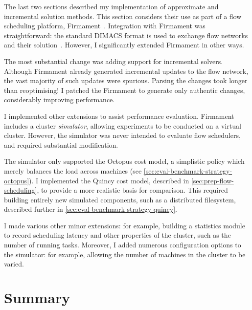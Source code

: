 The last two sections described my implementation of approximate and incremental solution methods. This section considers their use as part of a flow scheduling platform, Firmament~\cite[ch.~5]{Schwarzkopf:2015}. Integration with Firmament was straightforward: the standard DIMACS format is used to exchange flow networks and their solution~\cite{DIMACSStandard}. However, I significantly extended Firmament in other ways.

The most substantial change was adding support for incremental solvers. Although Firmament already generated incremental updates to the flow network, the vast majority of such updates were spurious\footnotemark. Parsing the changes took longer than reoptimising! I patched the Firmament to generate only authentic changes, considerably improving performance.

I implemented other extensions to assist performance evaluation. Firmament includes a cluster \emph{simulator}, allowing experiments to be conducted on a virtual cluster. However, the simulator was never intended to evaluate flow schedulers, and required substantial modification.

The simulator only supported the Octopus cost model, a simplistic policy which merely balances the load across machines (see \cref{sec:eval-benchmark-strategy-octopus}). I implemented the Quincy cost model, described in \cref{sec:prep-flow-scheduling}, to provide a more realistic basis for comparison. This required building entirely new simulated components, such as a distributed filesystem, described further in \cref{sec:eval-benchmark-strategy-quincy}.

I made various other minor extensions: for example, building a statistics module to record scheduling latency and other properties of the cluster, such as the number of running tasks. Moreover, I added numerous configuration options to the simulator: for example, allowing the number of machines in the cluster to be varied.


\section{Summary}

